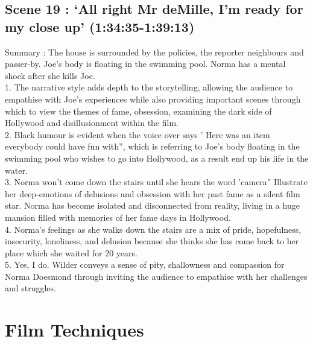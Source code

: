 \documentclass[a4paper]{article}
\begin{document}
\subsection{Scene 19 : ‘All right Mr deMille, I’m ready for my close up’
(1:34:35-1:39:13)}
Summary : The house is surrounded by the policies, the reporter neighbours and passer-by.
Joe’s body is floating in the swimming pool. Norma has a mental shock after she kills Joe.\\
1. The narrative style adds depth to the storytelling, allowing the audience to empathise
with Joe's experiences while also providing important scenes through which to view
the themes of fame, obsession, examining the dark side of Hollywood and
disillusionment within the film.\\
2. Black humour is evident when the voice over says ' Here was an item everybody
could have fun with”, which is referring to Joe’s body floating in the swimming pool
who wishes to go into Hollywood, as a result end up his life in the water.\\
3. Norma won’t come down the stairs until she hears the word 'camera” Illustrate her
deep-emotions of delusions and obsession with her past fame as a silent film star.
Norma has become isolated and disconnected from reality, living in a huge mansion
filled with memories of her fame days in Hollywood.\\
4. Norma's feelings as she walks down the stairs are a mix of pride, hopefulness,
insecurity, loneliness, and delusion because she thinks she has come back to her
place which she waited for 20 years.\\
5. Yes, I do. Wilder conveys a sense of pity, shallowness and compassion for Norma
Doesmond through inviting the audience to empathise with her challenges and
struggles.\\

\newpage
\section{Film Techniques}
\end{document}
